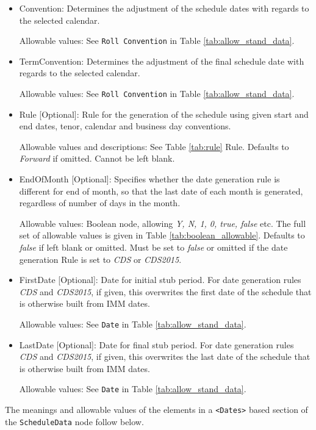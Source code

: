 \begin{itemize}
\item Convention: Determines the adjustment of the schedule dates with
  regards to the selected calendar. 

Allowable values: See \lstinline!Roll Convention! in Table
\ref{tab:allow_stand_data}.

\item TermConvention: Determines the adjustment of the final schedule
  date with regards to the selected calendar. 

Allowable values: See \lstinline!Roll Convention! in Table \ref{tab:allow_stand_data}.

\item Rule [Optional]: Rule for the generation of the schedule using given
  start and end dates, tenor, calendar and business day conventions. 

Allowable values and descriptions: See Table \ref{tab:rule} Rule. Defaults to \emph{Forward} if omitted. Cannot be left blank.

\item EndOfMonth [Optional]: Specifies whether the date generation rule is different for end of month, so that the last date of each month is generated, regardless of number of days in the month.

Allowable values: Boolean node, allowing \emph{Y, N, 1, 0, true, false} etc. The full set of allowable values is given in Table \ref{tab:boolean_allowable}. Defaults to \emph{false} if left blank or omitted. Must be set to \emph{false} or omitted if the date generation Rule is set to \emph{CDS} or \emph{CDS2015}.

\item FirstDate [Optional]: Date for initial stub period. For date generation rules \emph{CDS} and \emph{CDS2015}, if given, this
  overwrites the first date of the schedule that is otherwise built from IMM dates.

Allowable values: See \lstinline!Date! in Table \ref{tab:allow_stand_data}.

\item LastDate [Optional]: Date for final stub period. For date generation rules \emph{CDS} and \emph{CDS2015}, if given, this
  overwrites the last date of the schedule that is otherwise built from IMM dates.

Allowable values: See \lstinline!Date! in Table \ref{tab:allow_stand_data}.
\end{itemize}

\medskip
The meanings and allowable values of the elements in a {\tt <Dates>} based section of the  \lstinline!ScheduleData! node follow below.

